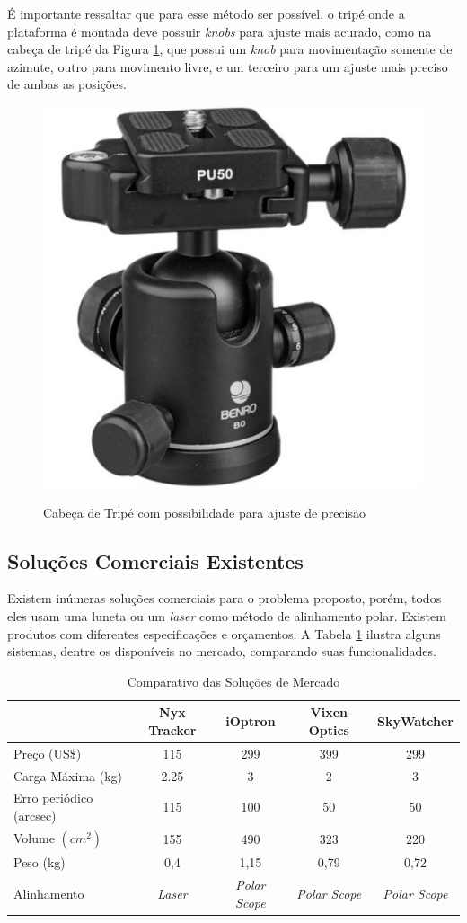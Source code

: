 É importante ressaltar que para esse método ser possível, o tripé onde a plataforma é montada deve possuir \textit{knobs} para ajuste mais acurado, como na cabeça de tripé da Figura \ref{fig:ballhead}, que possui um \textit{knob} para movimentação somente de azimute, outro para movimento livre, e um terceiro para um ajuste mais preciso de ambas as posições.

\begin{figure}[!htb]
	\centering
	\caption{Cabeça de Tripé com possibilidade para ajuste de precisão}
	\includegraphics[width=0.35\linewidth]{figuras/ballhead}
	\label{fig:ballhead}
\end{figure}

\subsection{Soluções Comerciais Existentes}

Existem inúmeras soluções comerciais para o problema proposto, porém, todos eles usam uma luneta ou um \textit{laser} como método de alinhamento polar. Existem produtos com diferentes especificações e orçamentos. A Tabela \ref{tabela_benchmark} ilustra alguns sistemas, dentre os disponíveis no mercado, comparando suas funcionalidades. 


\begin{table}[htb]
	\caption{Comparativo das Soluções de Mercado}
	\begin{tabular}{l|cccc}
		& Nyx Tracker & iOptron & Vixen Optics & SkyWatcher \\ \hline
		Preço (US\$) & 115 & 299 & 399 & 299 \\\hline
		Carga Máxima (kg) & 2.25 & 3 & 2 & 3 \\\hline
		Erro periódico (arcsec) & 115 & 100 & 50 & 50 \\\hline
		Volume $ (cm^2) $ & 155 & 490 & 323 & 220 \\\hline
		Peso (kg) & 0,4 & 1,15 & 0,79 & 0,72 \\\hline
		Alinhamento & \textit{Laser} & \textit{Polar Scope} & \textit{Polar Scope} & \textit{Polar Scope} \\
	\end{tabular}
	\label{tabela_benchmark}
\end{table}

